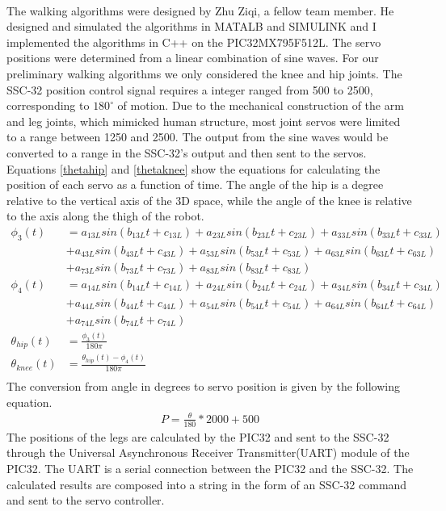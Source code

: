 \documentclass[titlepage,letterpaper,12pt]{article}
\begin{document}
\paragraph{} The walking algorithms were designed by Zhu Ziqi, a fellow team
member. He designed and simulated the algorithms in MATALB and SIMULINK and I
implemented the algorithms in C++ on the PIC32MX795F512L. The servo positions
were determined from a linear combination of sine waves. For our preliminary
walking algorithms we only considered the knee and hip joints. The SSC-32
position control signal requires a integer ranged from 500 to 2500,
corresponding to $180^{\circ}$ of motion\cite{sscdata}. Due to the mechanical
construction of the arm and leg joints, which mimicked human structure, most
joint servos were limited to a range between 1250 and 2500. The output from the
sine waves would be converted to a range in the SSC-32's output and then sent to
the servos. Equations \ref{thetahip} and \ref{thetaknee} show the equations for
calculating the position of each servo as a function of time. The angle of the
hip is a degree relative to the vertical axis of the 3D space, while the angle
of the knee is relative to the axis along the thigh of the robot.
\begin{align}
    \phi_{3}(t)&=a_{13L}sin(b_{13L}t+c_{13L})+a_{23L}sin(b_{23L}t+c_{23L})+a_{33L}sin(b_{33L}t+c_{33L})\nonumber\\
    &+a_{43L}sin(b_{43L}t+c_{43L})+a_{53L}sin(b_{53L}t+c_{53L})+a_{63L}sin(b_{63L}t+c_{63L})\nonumber\\
    &+a_{73L}sin(b_{73L}t+c_{73L})+a_{83L}sin(b_{83L}t+c_{83L}) \label{phi3}\\
    \phi_{4}(t)&=a_{14L}sin(b_{14L}t+c_{14L})+a_{24L}sin(b_{24L}t+c_{24L})+a_{34L}sin(b_{34L}t+c_{34L})\nonumber\\
    &+a_{44L}sin(b_{44L}t+c_{44L})+a_{54L}sin(b_{54L}t+c_{54L})+a_{64L}sin(b_{64L}t+c_{64L})\nonumber\\
    &+a_{74L}sin(b_{74L}t+c_{74L}) \label{phi4}\\
    \theta_{hip}(t)&=\frac{\phi_{3}(t)}{180\pi} \label{thetahip}\\
    \theta_{knee}(t)&=\frac{\theta_{hip}(t)-\phi_{4}(t)}{180\pi} \label{thetaknee}\\
\end{align}
The conversion from angle in degrees to servo position is given by the following
equation.
\begin{align}
    P=\frac{\theta}{180}*2000+500
\end{align}
The positions of the legs are calculated by the PIC32 and sent to the SSC-32
through the Universal Asynchronous Receiver Transmitter(UART) module of the
PIC32. The UART is a serial connection between the PIC32 and the SSC-32. The
calculated results are composed into a string in the form of an SSC-32 command
and sent to the servo controller. 
\end{document}
